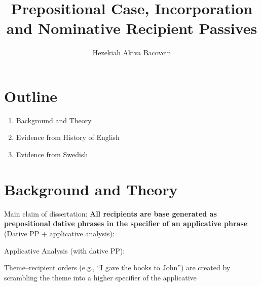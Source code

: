 \documentclass[11pt]{article}
\title{Prepositional Case, Incorporation and Nominative Recipient Passives}
\author{Hezekiah Akiva Bacovcin}
\begin{document}
\section{Outline}
\begin{enumerate}
	\item Background and Theory
	\item Evidence from History of English
	\item Evidence from Swedish
\end{enumerate}

\section{Background and Theory}
Main claim of dissertation: \textbf{All recipients are base generated as prepositional dative phrases in the specifier of an applicative phrase} (Dative PP + applicative analysis):

\begin{exe}
	\ex Applicative Analysis (with dative PP):\\
\end{exe}

Theme--recipient orders (e.g., ``I gave the books to John'') are created by scrambling the theme into a higher specifier of the applicative \citep{McGinnis.1998}

 
\end{document}
